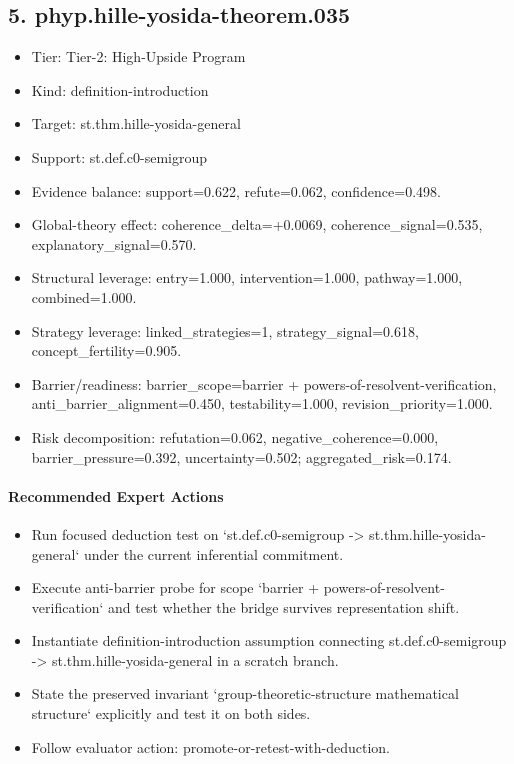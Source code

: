 \documentclass[11pt]{article}
\begin{document}
\subsection*{5. phyp.hille-yosida-theorem.035}
\begin{itemize}
\item Tier: Tier-2: High-Upside Program
\item Kind: definition-introduction
\item Target: st.thm.hille-yosida-general
\item Support: st.def.c0-semigroup
\item Evidence balance: support=0.622, refute=0.062, confidence=0.498.
\item Global-theory effect: coherence\_delta=+0.0069, coherence\_signal=0.535, explanatory\_signal=0.570.
\item Structural leverage: entry=1.000, intervention=1.000, pathway=1.000, combined=1.000.
\item Strategy leverage: linked\_strategies=1, strategy\_signal=0.618, concept\_fertility=0.905.
\item Barrier/readiness: barrier\_scope=barrier + powers-of-resolvent-verification, anti\_barrier\_alignment=0.450, testability=1.000, revision\_priority=1.000.
\item Risk decomposition: refutation=0.062, negative\_coherence=0.000, barrier\_pressure=0.392, uncertainty=0.502; aggregated\_risk=0.174.
\end{itemize}
\paragraph{Recommended Expert Actions}
\begin{itemize}
\item Run focused deduction test on `st.def.c0-semigroup -> st.thm.hille-yosida-general` under the current inferential commitment.
\item Execute anti-barrier probe for scope `barrier + powers-of-resolvent-verification` and test whether the bridge survives representation shift.
\item Instantiate definition-introduction assumption connecting st.def.c0-semigroup -> st.thm.hille-yosida-general in a scratch branch.
\item State the preserved invariant `group-theoretic-structure mathematical structure` explicitly and test it on both sides.
\item Follow evaluator action: promote-or-retest-with-deduction.
\end{itemize}
\end{document}
